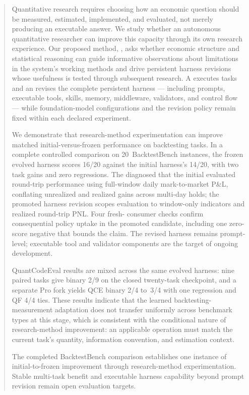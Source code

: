 \begin{abstract}
Quantitative research requires choosing how an economic question should be
measured, estimated, implemented, and evaluated, not merely producing an
executable answer.  We study whether an autonomous quantitative researcher can
improve this capacity through its own research experience.  Our proposed
method, \method{}, asks whether economic structure and statistical reasoning
can guide informative observations about limitations in the system's working
methods and drive persistent harness revisions whose usefulness is tested
through subsequent research.  A \Worker{} executes tasks and an \Evolver{}
revises the complete persistent \Worker{} harness --- including prompts,
executable tools, skills, memory, middleware, validators, and control flow ---
while foundation-model configurations and the revision policy remain fixed
within each declared experiment.

We demonstrate that research-method experimentation can improve matched
initial-versus-frozen performance on backtesting tasks.  In a complete
controlled comparison on 20~BacktestBench instances, the frozen evolved
harness scores 16/20 against the initial harness's 14/20, with two task gains
and zero regressions.  The \Evolver{} diagnosed that the initial \Worker{}
evaluated round-trip performance using full-window daily mark-to-market P\&L,
conflating unrealized and realized gains across multi-day holds; the promoted
harness revision scopes evaluation to window-only indicators and realized
round-trip PNL.  Four fresh-\Worker{} consumer checks confirm consequential
policy uptake in the promoted candidate, including one zero-score negative
that bounds the claim.  The revised harness remains prompt-level; executable
tool and validator components are the target of ongoing development.

QuantCodeEval results are mixed across the same evolved harness: nine paired
tasks give binary 2/9 on the closed twenty-task checkpoint, and a separate
Pro \Evolver{} fork yields QCE binary 2/4 to~3/4 with one regression and QF
4/4 ties.  These results indicate that the learned backtesting-measurement
adaptation does not transfer uniformly across benchmark types at this stage,
which is consistent with the conditional nature of research-method
improvement: an applicable operation must match the current task's quantity,
information convention, and estimation context.

The completed BacktestBench comparison establishes one instance of
initial-to-frozen improvement through research-method experimentation.
Stable multi-task benefit and executable harness capability beyond prompt
revision remain open evaluation targets.
\end{abstract}
